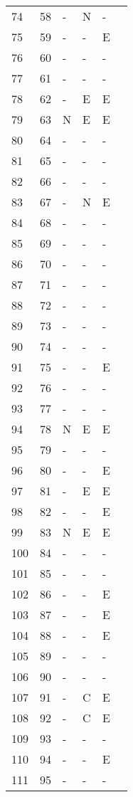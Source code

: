 \documentclass[10pt]{article}
\begin{document}
\begin{longtable}{llllll}
   74 & 58 & - & N & - &  \\ 
   75 & 59 & - & - & E &  \\ 
   76 & 60 & - & - & - &  \\ 
   77 & 61 & - & - & - &  \\ 
   78 & 62 & - & E & E &  \\ 
   79 & 63 & N & E & E &  \\ 
   80 & 64 & - & - & - &  \\ 
   81 & 65 & - & - & - &  \\ 
   82 & 66 & - & - & - &  \\ 
   83 & 67 & - & N & E &  \\ 
   84 & 68 & - & - & - &  \\ 
   85 & 69 & - & - & - &  \\ 
   86 & 70 & - & - & - &  \\ 
   87 & 71 & - & - & - &  \\ 
   88 & 72 & - & - & - &  \\ 
   89 & 73 & - & - & - &  \\ 
   90 & 74 & - & - & - &  \\ 
   91 & 75 & - & - & E &  \\ 
   92 & 76 & - & - & - &  \\ 
   93 & 77 & - & - & - &  \\ 
   94 & 78 & N & E & E &  \\ 
   95 & 79 & - & - & - &  \\ 
   96 & 80 & - & - & E &  \\ 
   97 & 81 & - & E & E &  \\ 
   98 & 82 & - & - & E &  \\ 
   99 & 83 & N & E & E &  \\ 
  100 & 84 & - & - & - &  \\ 
  101 & 85 & - & - & - &  \\ 
  102 & 86 & - & - & E &  \\ 
  103 & 87 & - & - & E &  \\ 
  104 & 88 & - & - & E &  \\ 
  105 & 89 & - & - & - &  \\ 
  106 & 90 & - & - & - &  \\ 
  107 & 91 & - & C & E &  \\ 
  108 & 92 & - & C & E &  \\ 
  109 & 93 & - & - & - &  \\ 
  110 & 94 & - & - & E &  \\ 
  111 & 95 & - & - & - &  \\ 

\end{longtable}
\end{document}
